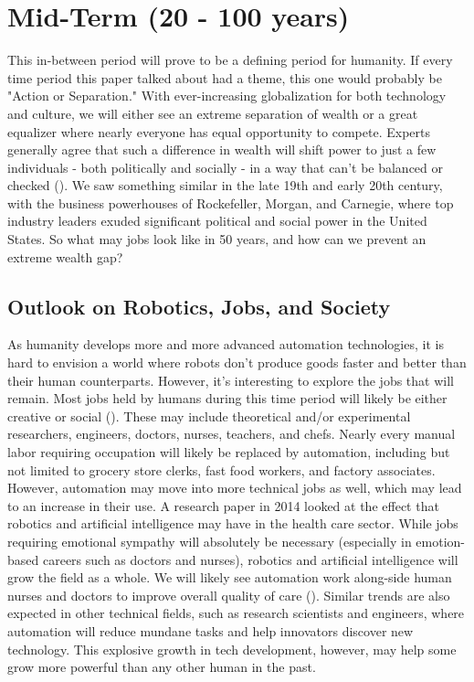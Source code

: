 \section{Mid-Term (20 - 100 years)}
\label{sec:mid}
This in-between period will prove to be a defining period for humanity. If every time period this paper talked about had a theme, this one would probably be "Action or Separation." With ever-increasing globalization for both technology and culture, we will either see an extreme separation of wealth or a great equalizer where nearly everyone has equal opportunity to compete. Experts generally agree that such a difference in wealth will shift power to just a few individuals - both politically and socially - in a way that can't be balanced or checked (\cite{WhatsWrongWithWealthDistribution}). We saw something similar in the late 19th and early 20th century, with the business powerhouses of Rockefeller, Morgan, and Carnegie, where top industry leaders exuded significant political and social power in the United States. So what may jobs look like in 50 years, and how can we prevent an extreme wealth gap?

\subsection{Outlook on Robotics, Jobs, and Society}

As humanity develops more and more advanced automation technologies, it is hard to envision a world where robots don't produce goods faster and better than their human counterparts. However, it's interesting to explore the jobs that will remain. Most jobs held by humans during this time period will likely be either creative or social (\cite{JobsNoAI}). These may include theoretical and/or experimental researchers, engineers, doctors, nurses, teachers, and chefs. Nearly every manual labor requiring occupation will likely be replaced by automation, including but not limited to grocery store clerks, fast food workers, and factory associates. However, automation may move into more technical jobs as well, which may lead to an increase in their use. A research paper in 2014 looked at the effect that robotics and artificial intelligence may have in the health care sector. While jobs requiring emotional sympathy will absolutely be necessary (especially in emotion-based careers such as doctors and nurses), robotics and artificial intelligence will grow the field as a whole. We will likely see automation work along-side human nurses and doctors to improve overall quality of care (\cite{FutureMedicalRobotics}). Similar trends are also expected in other technical fields, such as research scientists and engineers, where automation will reduce mundane tasks and help innovators discover new technology. This explosive growth in tech development, however, may help some grow more powerful than any other human in the past.

